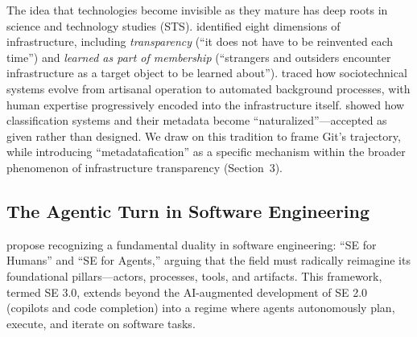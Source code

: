 \documentclass[12pt]{article}
\begin{document}
The idea that technologies become invisible as they mature has deep roots in science and technology studies (STS). \citet{star1996steps} identified eight dimensions of infrastructure, including \textit{transparency} (``it does not have to be reinvented each time'') and \textit{learned as part of membership} (``strangers and outsiders encounter infrastructure as a target object to be learned about''). \citet{edwards2003infrastructure} traced how sociotechnical systems evolve from artisanal operation to automated background processes, with human expertise progressively encoded into the infrastructure itself. \citet{bowker1999sorting} showed how classification systems and their metadata become ``naturalized''---accepted as given rather than designed. We draw on this tradition to frame Git's trajectory, while introducing ``metadatafication'' as a specific mechanism within the broader phenomenon of infrastructure transparency (Section~3).

\subsection{The Agentic Turn in Software Engineering}

\citet{hassan2025agentic} propose recognizing a fundamental duality in software engineering: ``SE for Humans'' and ``SE for Agents,'' arguing that the field must radically reimagine its foundational pillars---actors, processes, tools, and artifacts. This framework, termed SE 3.0, extends beyond the AI-augmented development of SE 2.0 (copilots and code completion) into a regime where agents autonomously plan, execute, and iterate on software tasks.
\end{document}
